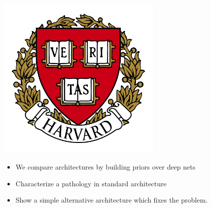\documentclass[portrait,a0b,final,a4resizeable]{include/a0poster}
\def\jointspacing{\vspace{0.3in}}
\begin{document}
\begin{poster}
\begin{center}
\begin{pcolumn}{1.03}
{{\begin{minipage}[c]{\logowidth}
\begin{flushright}
    \includegraphics[width=8cm,trim=2em 0em 2em 2em, clip]{badges/harvard}
  \end{flushright}
\end{minipage}}
%
}
\end{pcolumn}
\end{center}

\vspace*{3cm}

\large



\Large

\begin{multicols}{2}



\vspace*{-1.5cm}
\null\hspace*{3cm}\begin{minipage}[c]{0.8\columnwidth}
\centering
\begin{itemize}
\item We compare architectures by building priors over deep nets
\item Characterize a pathology in standard architecture
\item Show a simple alternative architecture which fixes the problem.
\end{itemize}
\end{minipage}

\jointspacing


\center
\begin{centering}

\end{centering}



\end{multicols}
\end{poster}
\end{document}

